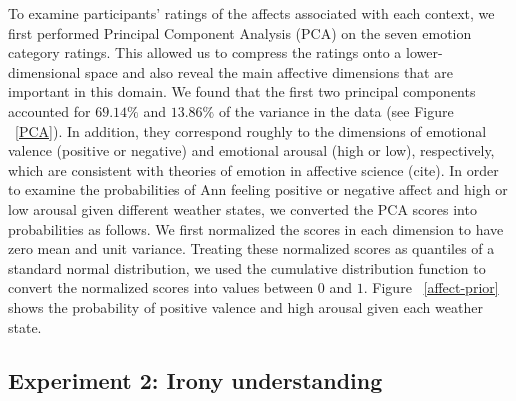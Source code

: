 \documentclass[10pt,letterpaper]{article}
\begin{document}
To examine participants' ratings of the affects associated with each context, we first performed Principal Component Analysis (PCA) on the seven emotion category ratings. This allowed us to compress the ratings onto a lower-dimensional space and also reveal the main affective dimensions that are important in this domain. We found that the first two principal components accounted for $69.14\%$ and $13.86\%$ of the variance in the data (see Figure ~\ref{PCA}). In addition, they correspond roughly to the dimensions of emotional valence (positive or negative) and emotional arousal (high or low), respectively, which are consistent with theories of emotion in affective science (cite). 
In order to examine the probabilities of Ann feeling positive or negative affect and high or low arousal given different weather states, we converted the PCA scores into probabilities as follows. We first normalized the scores in each dimension to have zero mean and unit variance. Treating these normalized scores as quantiles of a standard normal distribution, we used the cumulative distribution function to convert the normalized scores into values between $0$ and $1$. 
 Figure ~\ref{affect-prior} shows the probability of positive valence and high arousal given each weather state.

%

\subsection{Experiment 2: Irony understanding}
\end{document}
